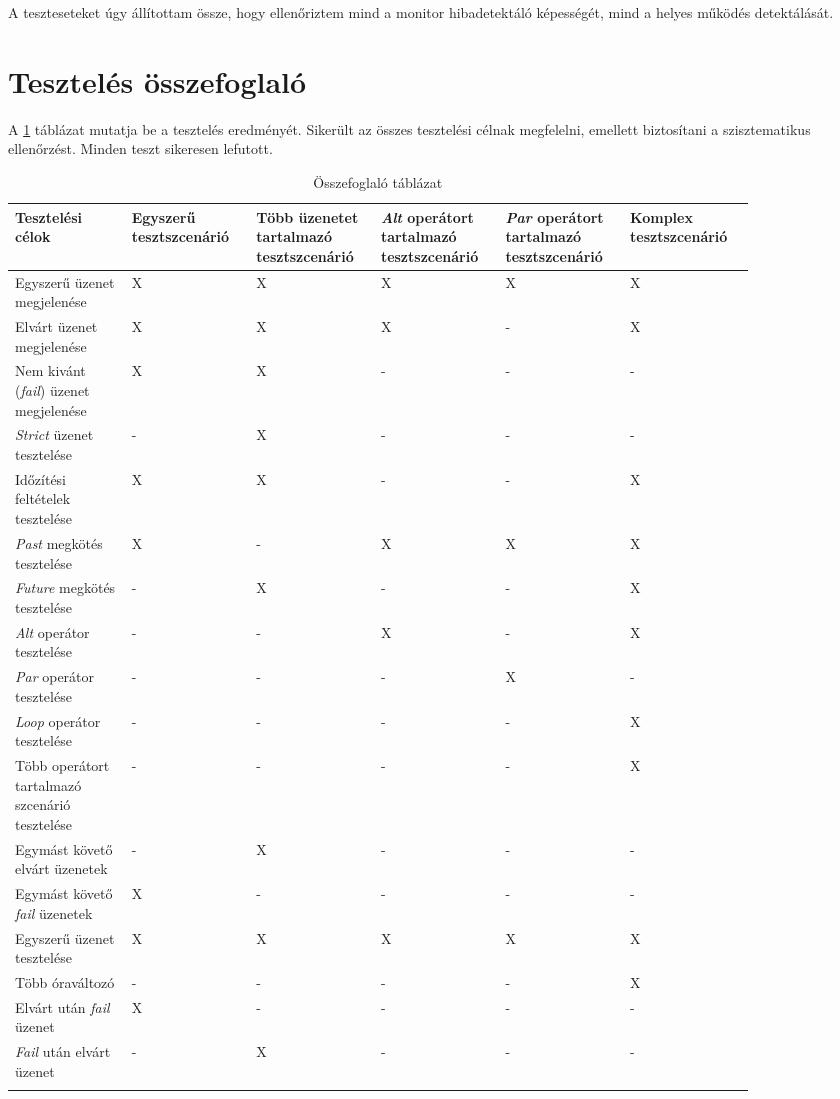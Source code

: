 A teszteseteket úgy állítottam össze, hogy ellenőriztem mind a monitor hibadetektáló képességét, mind a helyes működés detektálását.

\clearpage\section{Tesztelés összefoglaló}

A \ref{tab:table1} táblázat mutatja be a tesztelés eredményét.
Sikerült az összes tesztelési célnak megfelelni, emellett biztosítani a szisztematikus ellenőrzést.
Minden teszt sikeresen lefutott.

\begin{longtable}{|p{0.1428\linewidth}|p{0.1428\linewidth}|p{0.1428\linewidth}|p{0.1428\linewidth}|p{0.1428\linewidth}|p{0.1428\linewidth}|}
\hline
\textbf{Tesztelési célok} & \textbf{Egyszerű tesztszcenárió} & \textbf{Több üzenetet tartalmazó tesztszcenárió} & \textbf{\textit{Alt} operátort tartalmazó tesztszcenárió} & \textbf{\textit{Par} operátort tartalmazó tesztszcenárió} & \textbf{Komplex tesztszcenárió}\\
\hline
Egyszerű üzenet megjelenése & X & X & X & X & X\\
\hline
Elvárt üzenet megjelenése & X & X & X & - & X\\
\hline
Nem kivánt (\textit{fail}) üzenet megjelenése & X & X & - & - & -\\
\hline
\textit{Strict} üzenet tesztelése & - & X & - & - & -\\
\hline
Időzítési feltételek tesztelése & X & X & - & - & X\\
\hline
\textit{Past} megkötés tesztelése & X & - & X & X & X\\
\hline
\textit{Future} megkötés tesztelése & - & X & - & - & X\\
\hline
\textit{Alt} operátor tesztelése & - & - & X & - & X\\
\hline
\textit{Par} operátor tesztelése & - & - & - & X & -\\
\hline
\textit{Loop} operátor tesztelése & - & - & - & - & X\\
\hline
Több operátort tartalmazó szcenárió tesztelése & - & - & - & - & X\\
\hline
Egymást követő elvárt üzenetek & - & X & - & - & -\\
\hline
Egymást követő \textit{fail} üzenetek & X & - & - & - & -\\
\hline
Egyszerű üzenet tesztelése & X & X & X & X & X\\
\hline
Több óraváltozó & - & - & - & - & X\\
\hline
Elvárt után \textit{fail} üzenet & X & - & - & - & -\\
\hline
\textit{Fail} után elvárt üzenet & - & X & - & - & -\\
\hline
\caption{Összefoglaló táblázat}
\label{tab:table1}
\end{longtable}